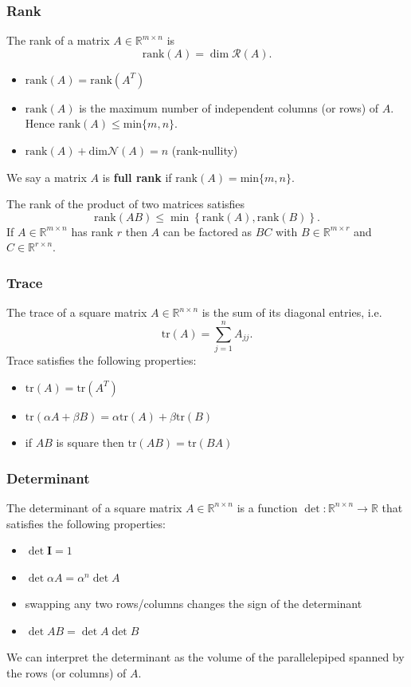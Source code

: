 \documentclass[11pt]{article}
\begin{document}
\subsubsection*{Rank}
The rank of a matrix $A \in \mathbb{R}^{m\times n}$ is 
\[ \mathrm{rank}(A) = \dim \mathcal{R}(A). \] 

\begin{itemize}
    \item $\mathrm{rank}(A) = \mathrm{rank}(A^T)$ 
    \item $\mathrm{rank}(A)$ is the maximum number of independent columns (or rows) of $A$. Hence $\mathrm{rank}(A) \leq \mathrm{min}\{m, n\}$. 
    \item $\mathrm{rank}(A) + \mathrm{dim}\mathcal{N}(A) = n$ (rank-nullity)
\end{itemize}
We say a matrix $A$ is \textbf{full rank} if $\mathrm{rank}(A) = \mathrm{min}\{m, n\}$. \par

The rank of the product of two matrices satisfies 
\[ \mathrm{rank}(AB) \leq \min\left\{ \mathrm{rank}(A), \mathrm{rank}(B) \right\}. \] 
If $A \in \mathbb{R}^{m\times n}$ has rank $r$ then $A$ can be factored as $BC$ with $B \in \mathbb{R}^{m\times r}$ and $C \in \mathbb{R}^{r \times n}$. 

\subsubsection*{Trace}
The trace of a square matrix $A \in \mathbb{R}^{n\times n}$ is the sum of its diagonal entries, i.e. 
\[ \mathrm{tr}(A) = \sum_{j=1}^n A_{jj}. \] 
Trace satisfies the following properties: 
\begin{itemize}
    \item $\mathrm{tr}(A) = \mathrm{tr}(A^T)$
    \item $\mathrm{tr}(\alpha A + \beta B) = \alpha\mathrm{tr}(A) + \beta\mathrm{tr}(B)$
    \item if $AB$ is square then $\mathrm{tr}(AB) = \mathrm{tr}(BA)$
\end{itemize}

\subsubsection*{Determinant}
The determinant of a square matrix $A \in \mathbb{R}^{n\times n}$ is a function $\det: \mathbb{R}^{n\times n} \rightarrow \mathbb{R}$ that satisfies the following properties:
\begin{itemize}
    \item $\det \bm{I} = 1$
    \item $\det \alpha A = \alpha^n \det A$
    \item swapping any two rows/columns changes the sign of the determinant 
    \item $\det AB = \det A \det B$
\end{itemize} 
We can interpret the determinant as the volume of the parallelepiped spanned by the rows (or columns) of $A$. \par
\end{document}
